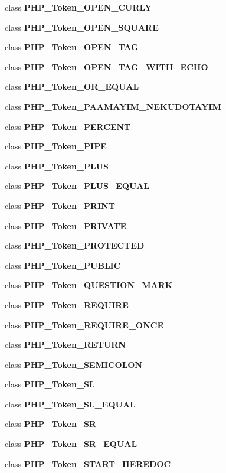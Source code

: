 \begin{DoxyCompactItemize}
class {\bf P\+H\+P\+\_\+\+Token\+\_\+\+O\+P\+E\+N\+\_\+\+C\+U\+R\+L\+Y}
\item 
class {\bf P\+H\+P\+\_\+\+Token\+\_\+\+O\+P\+E\+N\+\_\+\+S\+Q\+U\+A\+R\+E}
\item 
class {\bf P\+H\+P\+\_\+\+Token\+\_\+\+O\+P\+E\+N\+\_\+\+T\+A\+G}
\item 
class {\bf P\+H\+P\+\_\+\+Token\+\_\+\+O\+P\+E\+N\+\_\+\+T\+A\+G\+\_\+\+W\+I\+T\+H\+\_\+\+E\+C\+H\+O}
\item 
class {\bf P\+H\+P\+\_\+\+Token\+\_\+\+O\+R\+\_\+\+E\+Q\+U\+A\+L}
\item 
class {\bf P\+H\+P\+\_\+\+Token\+\_\+\+P\+A\+A\+M\+A\+Y\+I\+M\+\_\+\+N\+E\+K\+U\+D\+O\+T\+A\+Y\+I\+M}
\item 
class {\bf P\+H\+P\+\_\+\+Token\+\_\+\+P\+E\+R\+C\+E\+N\+T}
\item 
class {\bf P\+H\+P\+\_\+\+Token\+\_\+\+P\+I\+P\+E}
\item 
class {\bf P\+H\+P\+\_\+\+Token\+\_\+\+P\+L\+U\+S}
\item 
class {\bf P\+H\+P\+\_\+\+Token\+\_\+\+P\+L\+U\+S\+\_\+\+E\+Q\+U\+A\+L}
\item 
class {\bf P\+H\+P\+\_\+\+Token\+\_\+\+P\+R\+I\+N\+T}
\item 
class {\bf P\+H\+P\+\_\+\+Token\+\_\+\+P\+R\+I\+V\+A\+T\+E}
\item 
class {\bf P\+H\+P\+\_\+\+Token\+\_\+\+P\+R\+O\+T\+E\+C\+T\+E\+D}
\item 
class {\bf P\+H\+P\+\_\+\+Token\+\_\+\+P\+U\+B\+L\+I\+C}
\item 
class {\bf P\+H\+P\+\_\+\+Token\+\_\+\+Q\+U\+E\+S\+T\+I\+O\+N\+\_\+\+M\+A\+R\+K}
\item 
class {\bf P\+H\+P\+\_\+\+Token\+\_\+\+R\+E\+Q\+U\+I\+R\+E}
\item 
class {\bf P\+H\+P\+\_\+\+Token\+\_\+\+R\+E\+Q\+U\+I\+R\+E\+\_\+\+O\+N\+C\+E}
\item 
class {\bf P\+H\+P\+\_\+\+Token\+\_\+\+R\+E\+T\+U\+R\+N}
\item 
class {\bf P\+H\+P\+\_\+\+Token\+\_\+\+S\+E\+M\+I\+C\+O\+L\+O\+N}
\item 
class {\bf P\+H\+P\+\_\+\+Token\+\_\+\+S\+L}
\item 
class {\bf P\+H\+P\+\_\+\+Token\+\_\+\+S\+L\+\_\+\+E\+Q\+U\+A\+L}
\item 
class {\bf P\+H\+P\+\_\+\+Token\+\_\+\+S\+R}
\item 
class {\bf P\+H\+P\+\_\+\+Token\+\_\+\+S\+R\+\_\+\+E\+Q\+U\+A\+L}
\item 
class {\bf P\+H\+P\+\_\+\+Token\+\_\+\+S\+T\+A\+R\+T\+\_\+\+H\+E\+R\+E\+D\+O\+C}

\end{DoxyCompactItemize}
